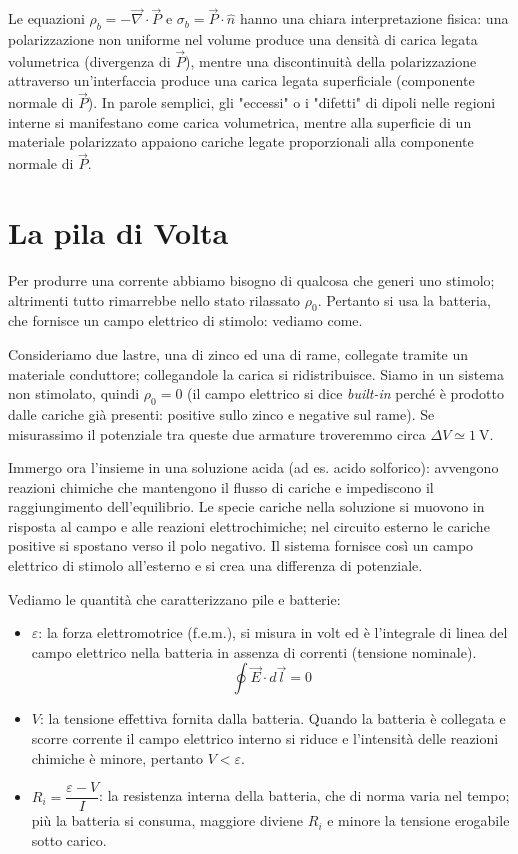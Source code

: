 \documentclass{book}
\begin{document}
Le equazioni $\rho_b=-\vec{\nabla}\cdot\vec{P}$ e $\sigma_b=\vec{P}\cdot\hat{n}$ hanno una chiara interpretazione fisica: una polarizzazione non uniforme nel volume produce una densit\`a di carica legata volumetrica (divergenza di $\vec{P}$), mentre una discontinuit\`a della polarizzazione attraverso un'interfaccia produce una carica legata superficiale (componente normale di $\vec{P}$). In parole semplici, gli "eccessi" o i "difetti" di dipoli nelle regioni interne si manifestano come carica volumetrica, mentre alla superficie di un materiale polarizzato appaiono cariche legate proporzionali alla componente normale di $\vec{P}$.



\section{La pila di Volta}

Per produrre una corrente abbiamo bisogno di qualcosa che generi uno stimolo; altrimenti tutto rimarrebbe nello stato rilassato \(\rho_0\). Pertanto si usa la batteria, che fornisce un campo elettrico di stimolo: vediamo come.

Consideriamo due lastre, una di zinco ed una di rame, collegate tramite un materiale conduttore; collegandole la carica si ridistribuisce. Siamo in un sistema non stimolato, quindi \(\rho_0=0\) (il campo elettrico si dice \emph{built-in} perché è prodotto dalle cariche già presenti: positive sullo zinco e negative sul rame). Se misurassimo il potenziale tra queste due armature troveremmo circa \(\Delta V \simeq 1\ \mathrm{V}\).

Immergo ora l'insieme in una soluzione acida (ad es. acido solforico): avvengono reazioni chimiche che mantengono il flusso di cariche e impediscono il raggiungimento dell'equilibrio. Le specie cariche nella soluzione si muovono in risposta al campo e alle reazioni elettrochimiche; nel circuito esterno le cariche positive si spostano verso il polo negativo. Il sistema fornisce così un campo elettrico di stimolo all'esterno e si crea una differenza di potenziale.

Vediamo le quantità che caratterizzano pile e batterie:
\begin{itemize}
    \item \(\varepsilon\): la forza elettromotrice (f.e.m.), si misura in volt ed è l'integrale di linea del campo elettrico nella batteria in assenza di correnti (tensione nominale).
    $$
    \oint \vec{E}\cdot d\vec{l}=0
    $$
    \item \(V\): la tensione effettiva fornita dalla batteria. Quando la batteria è collegata e scorre corrente il campo elettrico interno si riduce e l'intensità delle reazioni chimiche è minore, pertanto \(V<\varepsilon\).
    \item \(R_i=\dfrac{\varepsilon-V}{I}\): la resistenza interna della batteria, che di norma varia nel tempo; più la batteria si consuma, maggiore diviene \(R_i\) e minore la tensione erogabile sotto carico.
\end{itemize}
\end{document}
